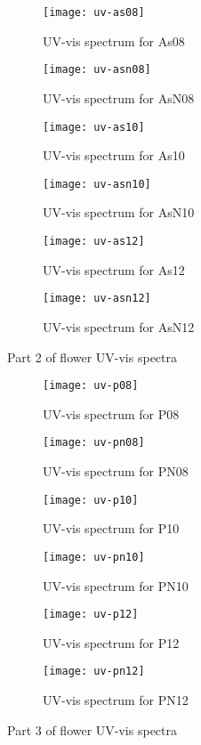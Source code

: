 \begin{figure*}[h]
\centering
\begin{subfigure}{8.25cm}\centering\texttt{[image: uv-as08]}\caption{UV-vis spectrum for As08}\end{subfigure}%
\begin{subfigure}{8.25cm}\centering\texttt{[image: uv-asn08]}\caption{UV-vis spectrum for AsN08}\end{subfigure}
\begin{subfigure}{8.25cm}\centering\texttt{[image: uv-as10]}\caption{UV-vis spectrum for As10}\end{subfigure}%
\begin{subfigure}{8.25cm}\centering\texttt{[image: uv-asn10]}\caption{UV-vis spectrum for AsN10}\end{subfigure}
\begin{subfigure}{8.25cm}\centering\texttt{[image: uv-as12]}\caption{UV-vis spectrum for As12}\end{subfigure}%
\begin{subfigure}{8.25cm}\centering\texttt{[image: uv-asn12]}\caption{UV-vis spectrum for AsN12}\end{subfigure}
\caption[Part 2 of flower UV-vis spectra]{Part 2 of flower UV-vis spectra}
\end{figure*}

\newpage

\begin{figure*}[h]
\centering
\begin{subfigure}{8.25cm}\centering\texttt{[image: uv-p08]}\caption{UV-vis spectrum for P08}\end{subfigure}%
\begin{subfigure}{8.25cm}\centering\texttt{[image: uv-pn08]}\caption{UV-vis spectrum for PN08}\end{subfigure}
\begin{subfigure}{8.25cm}\centering\texttt{[image: uv-p10]}\caption{UV-vis spectrum for P10}\end{subfigure}%
\begin{subfigure}{8.25cm}\centering\texttt{[image: uv-pn10]}\caption{UV-vis spectrum for PN10}\end{subfigure}
\begin{subfigure}{8.25cm}\centering\texttt{[image: uv-p12]}\caption{UV-vis spectrum for P12}\end{subfigure}%
\begin{subfigure}{8.25cm}\centering\texttt{[image: uv-pn12]}\caption{UV-vis spectrum for PN12}\end{subfigure}
\caption[Part 3 of flower UV-vis spectra]{Part 3 of flower UV-vis spectra}
\end{figure*}


